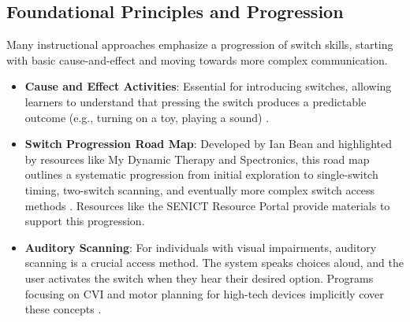 \subsection{Foundational Principles and Progression}
Many instructional approaches emphasize a progression of switch skills, starting with basic cause-and-effect and moving towards more complex communication.
\begin{itemize}
    \item \textbf{Cause and Effect Activities}: Essential for introducing switches, allowing learners to understand that pressing the switch produces a predictable outcome (e.g., turning on a toy, playing a sound)  \cite{TeachingVI_Switches}.
    \item \textbf{Switch Progression Road Map}: Developed by Ian Bean and highlighted by resources like My Dynamic Therapy and Spectronics, this road map outlines a systematic progression from initial exploration to single-switch timing, two-switch scanning, and eventually more complex switch access methods  \cite{MyDynamicTherapy}. Resources like the SENICT Resource Portal provide materials to support this progression.
\item \textbf{Auditory Scanning}: For individuals with visual impairments, auditory scanning is a crucial access method. The system speaks choices aloud, and the user activates the switch when they hear their desired option. Programs focusing on CVI and motor planning for high-tech devices implicitly cover these concepts  \cite{Perkins_CVI}.
\end{itemize}

